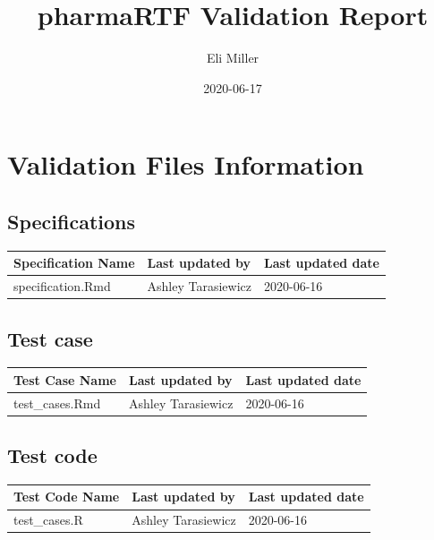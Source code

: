 \documentclass[]{article}
\title{pharmaRTF Validation Report}
\author{Eli Miller}
\date{2020-06-17}
\begin{document}
\maketitle

\newpage
\tableofcontents
\newpage

\hypertarget{validation-files-information}{%
\section{Validation Files
Information}\label{validation-files-information}}

\hypertarget{specifications}{%
\subsection{Specifications}\label{specifications}}

\begin{table}[H]
\centering
\begin{tabular}{lll}
\toprule
Specification Name & Last updated by & Last updated date\\
\midrule
\rowcolor{gray!6}  specification.Rmd & Ashley Tarasiewicz & 2020-06-16\\
\bottomrule
\end{tabular}
\end{table}

\hypertarget{test-case}{%
\subsection{Test case}\label{test-case}}

\begin{table}[H]
\centering
\begin{tabular}{lll}
\toprule
Test Case Name & Last updated by & Last updated date\\
\midrule
\rowcolor{gray!6}  test\_cases.Rmd & Ashley Tarasiewicz & 2020-06-16\\
\bottomrule
\end{tabular}
\end{table}

\hypertarget{test-code}{%
\subsection{Test code}\label{test-code}}

\begin{table}[H]
\centering
\begin{tabular}{lll}
\toprule
Test Code Name & Last updated by & Last updated date\\
\midrule
\rowcolor{gray!6}  test\_cases.R & Ashley Tarasiewicz & 2020-06-16\\
\bottomrule
\end{tabular}
\end{table}
\end{document}
